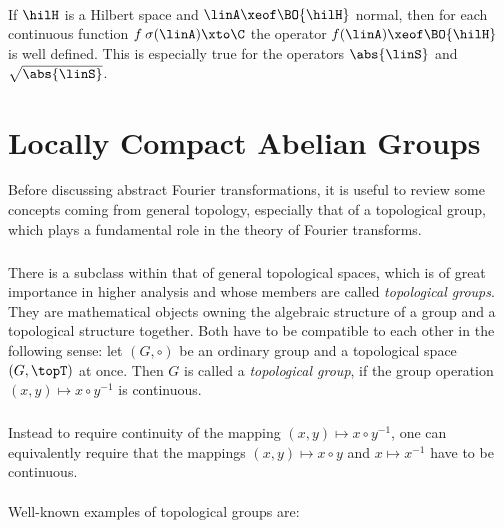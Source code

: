 \documentclass[11pt,twoside]{article}
\begin{document}
\paragraph{}
If $\hilH$ is a Hilbert space and $\linA \xeof \BO{\hilH}$ normal,
then for each continuous function $f \: \sigma(\linA) \xto \C$
the operator $f(\linA) \xeof \BO{\hilH}$ is well defined.
This is especially true for the operators 
$\abs{\linS} $ and $\sqrt{\abs{\linS} }$.

\section{Locally Compact Abelian Groups}
Before discussing abstract Fourier transformations,
it is useful to review some concepts coming from general topology,
especially that of a topological group, 
which plays a fundamental role in the theory of Fourier transforms.

\subparagraph{} %
There is a subclass within that of general topological spaces,
which is of great importance in higher analysis
and whose members are called \textit{topological groups}.
They are mathematical objects owning the algebraic structure of a group
and a topological structure together.
Both have to be compatible to each other in the following sense:
let $(G,\circ)$ be an ordinary group and a topological space $(G,\topT)$
at once.
Then $G$ is called a \textit{topological group},
if the group operation $(x,y) \mapsto x \circ y^{-1}$ is continuous.

\subparagraph{}
Instead to require continuity of the mapping $(x,y) \mapsto x \circ y^{-1}$,
one can equivalently require
that the mappings $(x,y) \mapsto x \circ y$ and $x \mapsto x^{-1}$
have to be continuous.

\paragraph{} %
Well-known examples of topological groups are:
\end{document}
